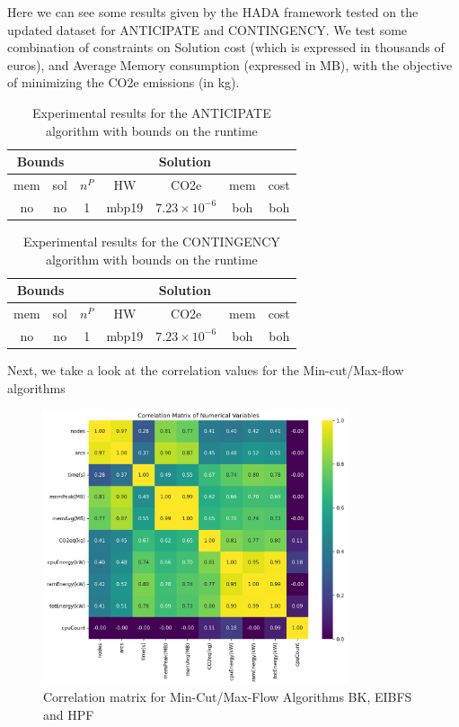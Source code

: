 \documentclass[a4paper,singleside,12pt]{report} %
\begin{document}
Here we can see some results given by the HADA framework tested on the updated dataset for ANTICIPATE and CONTINGENCY. We test some combination of constraints 
on Solution cost (which is expressed in thousands of euros), and Average Memory consumption (expressed in MB), with the objective of minimizing the CO2e emissions (in kg).

\begin{table}[h!]
    \centering
    \begin{tabular}{cc|ccccc}
        \hline
        \multicolumn{2}{c|}{Bounds} & \multicolumn{5}{c}{Solution} \\
        \hline
        mem & sol & $n^P$ & HW & CO2e & mem & cost \\
        \hline
        no & no & 1 & mbp19 & $7.23 \times 10^{-6}$ & boh & boh \\
        \hline
    \end{tabular}
    \caption{Experimental results for the ANTICIPATE algorithm with bounds on the runtime}
    \label{tab:anticipate_results}
\end{table}

\begin{table}[h!]
    \centering
    \begin{tabular}{cc|ccccc}
        \hline
        \multicolumn{2}{c|}{Bounds} & \multicolumn{5}{c}{Solution} \\
        \hline
        mem & sol & $n^P$ & HW & CO2e & mem & cost \\
        \hline
        no & no & 1 & mbp19 & $7.23 \times 10^{-6}$ & boh & boh \\
        \hline
    \end{tabular}
    \caption{Experimental results for the CONTINGENCY algorithm with bounds on the runtime}
    \label{tab:contingency_results}
\end{table}

Next, we take a look at the correlation values for the Min-cut/Max-flow algorithms

\begin{figure}[h!]
    \centering
    \includegraphics[width=0.8\textwidth]{imgs/max_flow_corr_mat.png}
    \caption{Correlation matrix for Min-Cut/Max-Flow Algorithms BK, EIBFS and HPF}
    \label{fig:max_flow_corr_mat}
\end{figure}
\end{document}
